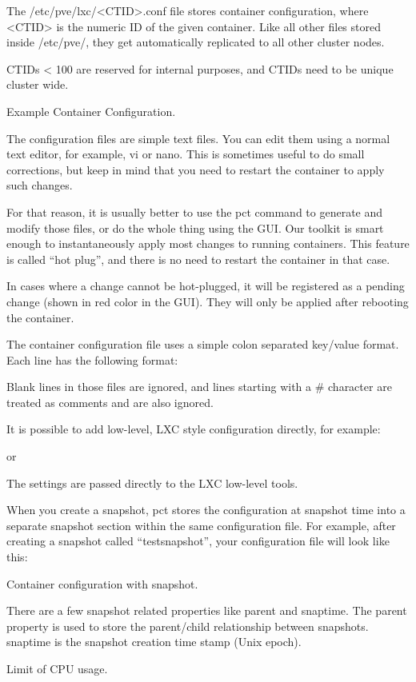 The /etc/pve/lxc/<CTID>.conf file stores container configuration, where <CTID> is the numeric ID of the given container. Like all other files stored inside /etc/pve/, they get automatically replicated to all other cluster nodes.

CTIDs < 100 are reserved for internal purposes, and CTIDs need to be unique cluster wide.

Example Container Configuration.

The configuration files are simple text files. You can edit them using a normal text editor, for example, vi or nano. This is sometimes useful to do small corrections, but keep in mind that you need to restart the container to apply such changes.

For that reason, it is usually better to use the pct command to generate and modify those files, or do the whole thing using the GUI. Our toolkit is smart enough to instantaneously apply most changes to running containers. This feature is called “hot plug”, and there is no need to restart the container in that case.

In cases where a change cannot be hot-plugged, it will be registered as a pending change (shown in red color in the GUI). They will only be applied after rebooting the container.

The container configuration file uses a simple colon separated key/value format. Each line has the following format:

Blank lines in those files are ignored, and lines starting with a # character are treated as comments and are also ignored.

It is possible to add low-level, LXC style configuration directly, for example:

or

The settings are passed directly to the LXC low-level tools.

When you create a snapshot, pct stores the configuration at snapshot time into a separate snapshot section within the same configuration file. For example, after creating a snapshot called “testsnapshot”, your configuration file will look like this:

Container configuration with snapshot.

There are a few snapshot related properties like parent and snaptime. The parent property is used to store the parent/child relationship between snapshots. snaptime is the snapshot creation time stamp (Unix epoch).

Limit of CPU usage.

